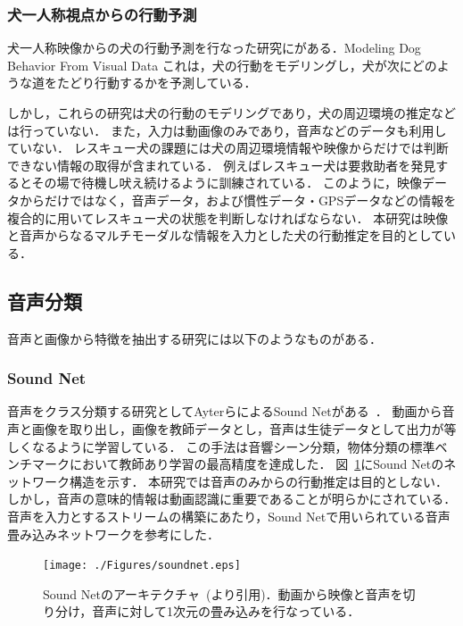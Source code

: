 \subsubsection{犬一人称視点からの行動予測}
犬一人称映像からの犬の行動予測を行なった研究に\cite{whoretthedog}がある．Modeling Dog Behavior From Visual Data
これは，犬の行動をモデリングし，犬が次にどのような道をたどり行動するかを予測している．

しかし，これらの研究は犬の行動のモデリングであり，犬の周辺環境の推定などは行っていない．
また，入力は動画像のみであり，音声などのデータも利用していない．
レスキュー犬の課題には犬の周辺環境情報や映像からだけでは判断できない情報の取得が含まれている．
例えばレスキュー犬は要救助者を発見するとその場で待機し吠え続けるように訓練されている．
このように，映像データからだけではなく，音声データ，および慣性データ・GPSデータなどの情報を複合的に用いてレスキュー犬の状態を判断しなければならない．
本研究は映像と音声からなるマルチモーダルな情報を入力とした犬の行動推定を目的としている． 


\subsection{音声分類}
音声と画像から特徴を抽出する研究には以下のようなものがある．
\subsubsection{Sound Net}
音声をクラス分類する研究としてAyterらによるSound Netがある~\cite{aytar2016soundnet}．
動画から音声と画像を取り出し，画像を教師データとし，音声は生徒データとして出力が等しくなるように学習している．
この手法は音響シーン分類，物体分類の標準ベンチマークにおいて教師あり学習の最高精度を達成した．
図~\ref{soundnet_network}にSound Netのネットワーク構造を示す．
本研究では音声のみからの行動推定は目的としない．しかし，音声の意味的情報は動画認識に重要であることが明らかにされている．
音声を入力とするストリームの構築にあたり，Sound Netで用いられている音声畳み込みネットワークを参考にした．
\begin{figure}[htbp]
 \begin{center}
  \texttt{[image: ./Figures/soundnet.eps]}
  \caption{Sound Netのアーキテクチャ~(\cite{aytar2016soundnet}より引用)．動画から映像と音声を切り分け，音声に対して1次元の畳み込みを行なっている．}
  \label{soundnet_network}
 \end{center}
\end{figure}

